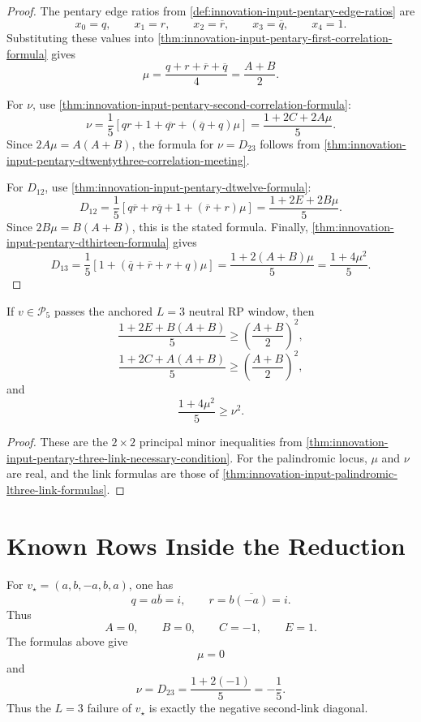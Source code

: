 \begin{proof}
The pentary edge ratios from
\autoref{def:innovation-input-pentary-edge-ratios} are
$$
x_0=q,
\qquad
x_1=r,
\qquad
x_2=\overline r,
\qquad
x_3=\overline q,
\qquad
x_4=1.
$$
Substituting these values into
\autoref{thm:innovation-input-pentary-first-correlation-formula} gives
$$
\mu
=
\frac{q+r+\overline r+\overline q}{4}
=
\frac{A+B}{2}.
$$

For $\nu$, use
\autoref{thm:innovation-input-pentary-second-correlation-formula}:
$$
\nu
=
\frac15
\left[
qr+1+\overline{qr}+(\overline q+q)\mu
\right]
=
\frac{1+2C+2A\mu}{5}.
$$
Since $2A\mu=A(A+B)$, the formula for $\nu=D_{23}$ follows from
\autoref{thm:innovation-input-pentary-dtwentythree-correlation-meeting}.

For $D_{12}$, use
\autoref{thm:innovation-input-pentary-dtwelve-formula}:
$$
D_{12}
=
\frac15
\left[
q\overline r+r\overline q+1+(\overline r+r)\mu
\right]
=
\frac{1+2E+2B\mu}{5}.
$$
Since $2B\mu=B(A+B)$, this is the stated formula. Finally,
\autoref{thm:innovation-input-pentary-dthirteen-formula} gives
$$
D_{13}
=
\frac15
\left[
1+(\overline q+\overline r+r+q)\mu
\right]
=
\frac{1+2(A+B)\mu}{5}
=
\frac{1+4\mu^2}{5}.
$$
\end{proof}

\begin{corollary}
\label{cor:innovation-input-palindromic-three-link-inequalities}
If $v\in\mathcal P_5$ passes the anchored $L=3$ neutral RP window, then
$$
\frac{1+2E+B(A+B)}{5}
\ge
\left(\frac{A+B}{2}\right)^2,
$$
$$
\frac{1+2C+A(A+B)}{5}
\ge
\left(\frac{A+B}{2}\right)^2,
$$
and
$$
\frac{1+4\mu^2}{5}
\ge
\nu^2.
$$
\end{corollary}

\begin{proof}
These are the $2\times2$ principal minor inequalities from
\autoref{thm:innovation-input-pentary-three-link-necessary-condition}.
For the palindromic locus, $\mu$ and $\nu$ are real, and the link formulas
are those of
\autoref{thm:innovation-input-palindromic-lthree-link-formulas}.
\end{proof}

\section{Known Rows Inside the Reduction}
\label{sec:innovation-input-known-rows-palindromic-reduction}

\begin{example}
\label{ex:innovation-input-pythagorean-palindromic-reduction}
For $v_\star=(a,b,-a,b,a)$, one has
$$
q=a\overline b=i,
\qquad
r=b\overline{(-a)}=i.
$$
Thus
$$
A=0,
\qquad
B=0,
\qquad
C=-1,
\qquad
E=1.
$$
The formulas above give
$$
\mu=0
$$
and
$$
\nu=D_{23}
=
\frac{1+2(-1)}{5}
=
-\frac15.
$$
Thus the $L=3$ failure of $v_\star$ is exactly the negative second-link
diagonal.
\end{example}

